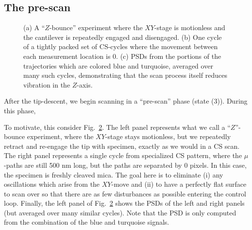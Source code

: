 \documentclass[twocolumn,oneside]{IEEEtran/IEEEtran}
\begin{document}
\subsection{The pre-scan}
\begin{figure}
  \begin{subfigure}{.33\textwidth}
    
    \caption{ }
  \end{subfigure}
  \begin{subfigure}{.33\textwidth}
    
    \caption{ }
    \label{fig:uz_prescan}
  \end{subfigure}
  \begin{subfigure}{.33\textwidth}
    
    \caption{ }
  \end{subfigure}
  \caption{(a) A ``$Z$-bounce'' experiment where the $XY$-stage is motionless
    and the cantilever is repeatedly engaged and disengaged. (b) One cycle of a
    tightly packed set of CS-cycles where the movement between each measurement
    location is 0. (c) PSDs from the portions of the trajectories which are
    colored blue and turquoise, averaged over many such cycles, demonstrating
    that the scan process itself reduces vibration in the $Z$-axis.}
  \label{fig:prescan_difference}
\end{figure}
After the tip-descent, we begin scanning in a ``pre-scan'' phase (state (3)).
During this phase, 

To motivate, this consider Fig.~\ref{fig:prescan_difference}. The left panel
represents what we call a ``$Z$''-bounce experiment, where the $XY$-stage stays
motionless, but we repeatedly retract and re-engage the tip with specimen,
exactly as we would in a CS scan. The right panel represents a single cycle from
specialized CS pattern, where the $\mu$-paths are still 500 nm long, but the
paths are separated by 0 pixels.
In this case, the specimen is freshly cleaved
mica.
The goal here is to eliminate (i) any oscillations which arise from the
$XY$-move and (ii) to have a perfectly flat surface to scan over so that
there are as few disturbances as possible entering the control loop. Finally,
the left panel of Fig.~\ref{fig:prescan_difference} shows the PSDs of the left
and right panels (but averaged over many similar cycles). Note that the PSD is
only computed from the combination of the blue and turquoise signals.
\end{document}
